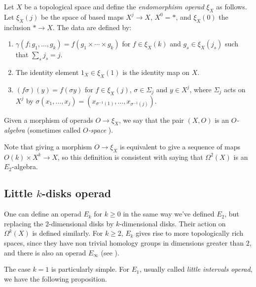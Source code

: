\documentclass[TFM.tex]{subfiles}
\begin{document}
\begin{defi}\label{endomorphism}
Let $X$ be a topological space and define the \emph{endomorphism operad} $\xi_X$ as follows. Let $\xi_X(j)$ be the space of based maps $X^j\to X$, $X^0=*$, and $\xi_X(0)$ the inclusion $*\to X$. The data are defined by:
\begin{enumerate}
\item $\gamma(f;g_1,\dots, g_k)=f(g_1\times\cdots\times g_k)$ for $f\in \xi_X(k)$ and $g_s\in\xi_X(j_s)$ such that $\sum_s j_s=j$.
\item The identity element $1_X\in\xi_X(1)$ is the identity map on $X$.
\item $(f\sigma)(y)=f(\sigma y)$ for $f\in\xi_X(j)$, $\sigma\in\Sigma_j$ and $y\in X^j$, where $\Sigma_j$ acts on $X^j$ by $\sigma(x_1,\dots, x_j)=(x_{\sigma^{-1}(1)},\dots, x_{\sigma^{-1}(j)})$. 
\end{enumerate}

Given a morphism of operads $O\to \xi_X$, we say that the pair $(X,O)$ is an \emph{$O$-algebra} (sometimes called \emph{$O$-space} \cite{May}).
\end{defi}


Note that giving a morphism $O\to \xi_X$ is equivalent to give a sequence of maps $O(k)\times X^k\to X$, so this definition is consistent with saying that $\Omega^2(X)$ is an $E_2$-algebra. 





%
\subsection{Little $k$-disks operad}\label{intervals}

One can define an operad $E_k$ for $k\geq 0$ in the same way we've defined $E_2$, but replacing the 2-dimensional disks by $k$-dimensional disks. Their action on $\Omega^k(X)$ is defined similarly. For $k\geq 2$, $E_k$ gives rise to more topologically rich spaces, since they have non trivial homology groups in dimensions greater than $2$, and there is also an operad $E_\infty$ (see \cite{cuentas}). 

The case $k=1$ is particularly simple. For $E_1$, usually called \emph{little intervals operad}, we have the following proposition.
\end{document}
